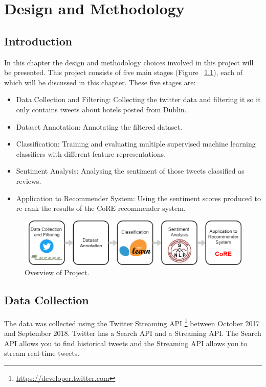 \chapter{Design and Methodology}

\section{Introduction}

In this chapter the design and methodology choices involved in this project will be presented. This project consists of five main stages (Figure ~\ref{fig:pipeline}), each of which will be discussed in this chapter. These five stages are:
\begin{itemize}
    \item Data Collection and Filtering: Collecting the twitter data and filtering it so it only contains tweets about hotels posted from Dublin.
    \item Dataset Annotation: Annotating the filtered dataset.
    \item Classification: Training and evaluating multiple supervised machine learning classifiers with different feature representations.
    \item Sentiment Analysis: Analysing the sentiment of those tweets classified as reviews.
    \item Application to Recommender System: Using the sentiment scores produced to re rank the results of the CoRE\cite{core2019} recommender system.
\end{itemize}

\begin{figure}[h!]
\centering
\includegraphics[width=1\textwidth]{design_and_methodology/pipeline.png}
\caption{\label{fig:pipeline} Overview of Project.}
\end{figure}

\section{Data Collection}
The data was collected using the Twitter Streaming API \footnote{\url{https://developer.twitter.com}} between October 2017 and September 2018. Twitter has a Search API and a Streaming API. The Search API allows you to find historical tweets and the Streaming API allows you to stream real-time tweets.

